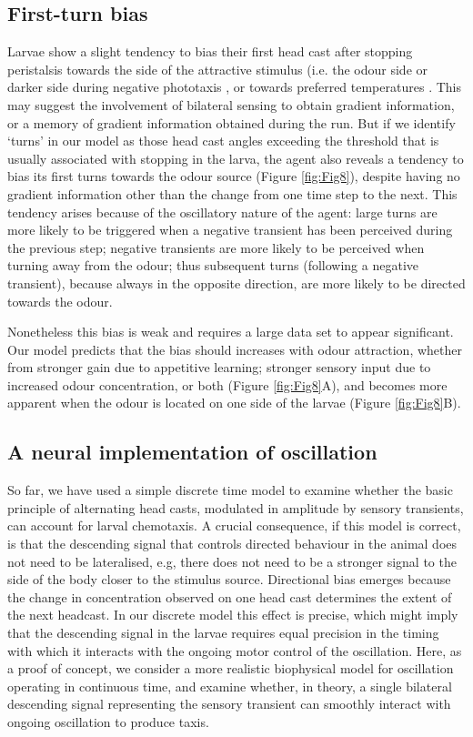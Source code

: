 \documentclass[10pt,a4paper]{article}
\begin{document}
\subsection{First-turn bias}
Larvae show a slight tendency to bias their first head cast after stopping peristalsis towards the side of the attractive stimulus (i.e. the odour side \citep{gomez2011active,gomez2012active} or darker side during negative phototaxis \citep{kane2013sensorimotor}, or towards preferred temperatures \citep{luo2010navigational}. This may suggest the involvement of bilateral sensing to obtain gradient information, or a memory of gradient information obtained during the run. But if we identify ‘turns’ in our model as those head cast angles exceeding the threshold that is usually associated with stopping in the larva, the agent also reveals a tendency to bias its first turns towards the odour source (Figure \ref{fig:Fig8}), despite having no gradient information other than the change from one time step to the next. This tendency arises because of the oscillatory nature of the agent: large turns are more likely to be triggered when a negative transient has been perceived during the previous step; negative transients are more likely to be perceived when turning away from the odour; thus subsequent turns (following a negative transient), because always in the opposite direction, are more likely to be directed towards the odour. 

Nonetheless this bias is weak and requires a large data set to appear significant. Our model predicts that the bias should  increases with odour attraction, whether from stronger gain due to appetitive learning; stronger sensory input due to increased odour concentration, or both (Figure \ref{fig:Fig8}A), and becomes more apparent when the odour is located on one side of the larvae (Figure \ref{fig:Fig8}B).

\subsection{A neural implementation of oscillation}
So far, we have used a simple discrete time model to examine whether the basic principle of alternating head casts, modulated in amplitude by sensory transients, can account for larval chemotaxis. A crucial consequence, if this model is correct, is that the descending signal that controls directed behaviour in the animal does not need to be lateralised, e.g, there does not need to be a stronger signal to the side of the body closer to the stimulus source. Directional bias emerges because the change in concentration observed on one head cast determines the extent of the next headcast. In our discrete model this effect is precise, which might imply that the descending signal in the larvae requires equal precision in the timing with which it interacts with the ongoing motor control of the oscillation. Here, as a proof of concept, we consider a more realistic biophysical model for oscillation operating in continuous time, and examine whether, in theory, a single bilateral descending signal representing the sensory transient can smoothly interact with ongoing oscillation to produce taxis.
\end{document}
